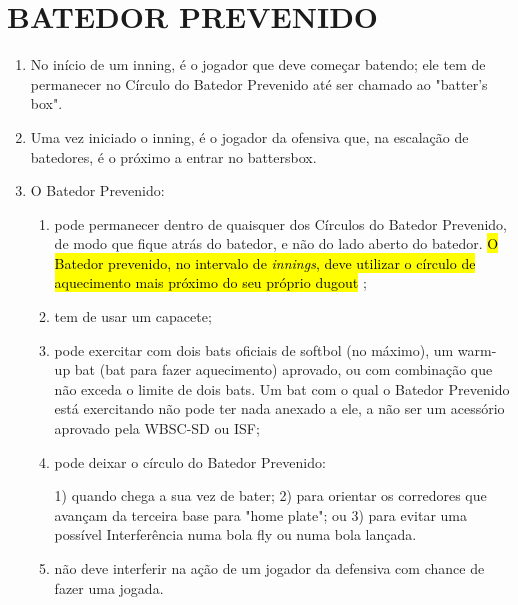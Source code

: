 \section{BATEDOR PREVENIDO}

\begin{enumerate}[label=(\alph*)]
	\item  No início de um \gls{inning}, é o jogador que deve começar batendo; ele tem de permanecer no Círculo do Batedor Prevenido até ser chamado ao "batter's box".
	\item  Uma vez iniciado o \gls{inning}, é o jogador da ofensiva que, na escalação de batedores, é o próximo a entrar no \gls{battersbox}.
	\item  O Batedor Prevenido:
	\begin{enumerate}[label=\roman*.]
		\item pode permanecer dentro de quaisquer dos Círculos do Batedor Prevenido, de modo que fique atrás do batedor, e não do lado aberto do batedor. \hl{O Batedor prevenido, no intervalo de \textit{innings}, deve utilizar o c\'irculo de aquecimento mais pr\'oximo do seu pr\'oprio dugout };
		\item tem de usar um capacete;
		\item  pode exercitar com dois \glspl{bat} oficiais de softbol (no máximo), um \gls{warm-up bat} (\gls{bat} para fazer aquecimento) aprovado, ou com combinação que não exceda o limite de dois \glspl{bat}. Um \gls{bat} com o qual o Batedor Prevenido está  exercitando não pode ter nada anexado a ele, a não ser um acessório aprovado pela WBSC-SD ou ISF;
		\item  pode deixar o círculo do Batedor Prevenido:

		1) quando chega a sua vez de bater;
		2) para orientar os corredores que avançam da terceira base para "home plate"; ou
		3) para evitar uma possível Interferência numa bola \gls{fly} ou numa bola lançada.

		\item  não deve interferir na ação de um jogador da defensiva com chance de fazer uma jogada.
	\end{enumerate}
\end{enumerate}

